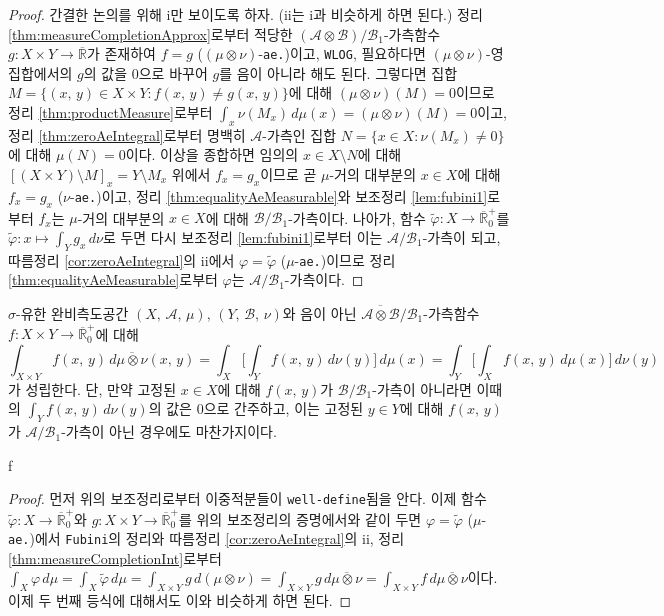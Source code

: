 \begin{proof}
    간결한 논의를 위해 i만 보이도록 하자. (ii는 i과 비슷하게 하면 된다.) 정리 \ref{thm:measureCompletionApprox}로부터 적당한 $(\mathcal{A}\otimes\mathcal{B})/\mathcal{B}_1$-가측함수 $g:X\times Y\to\overline{\mathbb{R}}$가 존재하여 $f=g$ ($(\mu\otimes\nu)$-\texttt{ae.})이고, \texttt{WLOG}, 필요하다면 $(\mu\otimes\nu)$-영집합에서의 $g$의 값을 0으로 바꾸어 $g$를 음이 아니라 해도 된다. 그렇다면 집합 $M=\{(x,\,y)\in X\times Y:f(x,\,y)\ne g(x,\,y)\}$에 대해 $(\mu\otimes\nu)(M)=0$이므로 정리 \ref{thm:productMeasure}로부터 $\int_x\nu(M_x)\,d\mu(x)=(\mu\otimes\nu)(M)=0$이고, 정리 \ref{thm:zeroAeIntegral}로부터 명백히 $\mathcal{A}$-가측인 집합 $N=\{x\in X:\nu(M_x)\ne0\}$에 대해 $\mu(N)=0$이다. 이상을 종합하면 임의의 $x\in X\setminus N$에 대해 $[(X\times Y)\setminus M]_x=Y\setminus M_x$ 위에서 $f_x=g_x$이므로 곧 $\mu$-거의 대부분의 $x\in X$에 대해 $f_x=g_x$ ($\nu$-\texttt{ae.})이고, 정리 \ref{thm:equalityAeMeasurable}와 보조정리 \ref{lem:fubini1}로부터 $f_x$는 $\mu$-거의 대부분의 $x\in X$에 대해 $\mathcal{B}/\mathcal{B}_1$-가측이다. 나아가, 함수 $\widetilde{\varphi}:X\to\overline{\mathbb{R}}^+_0$를 $\widetilde{\varphi}:x\mapsto\int_Yg_x\,d\nu$로 두면 다시 보조정리 \ref{lem:fubini1}로부터 이는 $\mathcal{A}/\mathcal{B}_1$-가측이 되고, 따름정리 \ref{cor:zeroAeIntegral}의 ii에서 $\varphi=\widetilde{\varphi}$ ($\mu$-\texttt{ae.})이므로 정리 \ref{thm:equalityAeMeasurable}로부터 $\varphi$는 $\mathcal{A}/\mathcal{B}_1$-가측이다.
\end{proof}

\begin{theorem}[Fubini]
    $\sigma$-유한 완비측도공간 $(X,\,\mathcal{A},\,\mu),\,(Y,\,\mathcal{B},\,\nu)$와 음이 아닌 $\overline{\mathcal{A}\otimes\mathcal{B}}/\mathcal{B}_1$-가측함수 $f:X\times Y\to\overline{\mathbb{R}}^+_0$에 대해
    \begin{equation*}
        \int_{X\times Y}f(x,\,y)\,d\overline{\mu\otimes\nu}(x,\,y)=\int_X\bigg[\int_Yf(x,\,y)\,d\nu(y)\bigg]\,d\mu(x)=\int_Y\bigg[\int_Xf(x,\,y)\,d\mu(x)\bigg]\,d\nu(y)
    \end{equation*}
    가 성립한다. 단, 만약 고정된 $x\in X$에 대해 $f(x,\,y)$가 $\mathcal{B}/\mathcal{B}_1$-가측이 아니라면 이때의 $\int_Yf(x,\,y)\,d\nu(y)$의 값은 0으로 간주하고, 이는 고정된 $y\in Y$에 대해 $f(x,\,y)$가 $\mathcal{A}/\mathcal{B}_1$-가측이 아닌 경우에도 마찬가지이다.
\end{theorem}
f
\begin{proof}
    먼저 위의 보조정리로부터 이중적분들이 \texttt{well-define}됨을 안다. 이제 함수 $\widetilde{\varphi}:X\to\overline{\mathbb{R}}^+_0$와 $g:X\times Y\to\overline{\mathbb{R}}^+_0$를 위의 보조정리의 증명에서와 같이 두면 $\varphi=\widetilde{\varphi}$ ($\mu$-\texttt{ae.})에서 \texttt{Fubini}의 정리와 따름정리 \ref{cor:zeroAeIntegral}의 ii, 정리 \ref{thm:measureCompletionInt}로부터 $\int_X\varphi\,d\mu=\int_X\widetilde{\varphi}\,d\mu=\int_{X\times Y}g\,d(\mu\otimes\nu)=\int_{X\times Y}g\,d\overline{\mu\otimes\nu}=\int_{X\times Y}f\,d\overline{\mu\otimes\nu}$이다. 이제 두 번째 등식에 대해서도 이와 비슷하게 하면 된다.
\end{proof}

